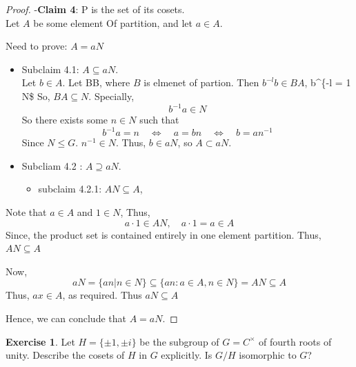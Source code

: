 \documentclass[
]{book}
\providecommand{\tightlist}{%
  \setlength{\itemsep}{0pt}\setlength{\parskip}{0pt}}
\theoremstyle{definition}
\theoremstyle{definition}
\theoremstyle{definition}
\newtheorem{exercise}{Exercise}[chapter]
\theoremstyle{definition}
\theoremstyle{remark}
\begin{document}
\begin{proof}
-\textbf{Claim 4}: P is the set of its cosets.\\
Let \(A\) be some element Of partition, and let \(a \in A\).

Need to prove: \(A=aN\)

\begin{itemize}
\item
  Subclaim 4.1: \(A\subseteq aN\).\\
  Let \(b\in A\). Let B\in B, where \(B\) is elmenet of partion.
  Then \(b^{-l}b\in BA\), \quad b\^{}\{-l = 1 \in N\$
  So, \(BA \subseteq N\). Specially,
  \[b^{-1}a \in N\]
  So there exists some \(n \in N\) such that
  \[b^{-1}a = n \quad \iff \quad a =bn \quad \iff \quad b=an^{-1}\]
  Since \(N\leq G\). \(n^{-1}\in N\). Thus, \(b \in aN\), so \(A \subset aN\).
\item
  Subcliam 4.2 : \(A\supseteq aN\).\\

  \begin{itemize}
  \tightlist
  \item
    subclaim 4.2.1: \(AN \subseteq A\),
  \end{itemize}
\end{itemize}

Note that \(a \in A\) and \(1 \in N\), Thus,
\[a\cdot 1\in AN, \quad a\cdot 1=a\in A\]
Since, the product set is contained entirely in one element
partition. Thus, \(AN\subseteq A\)

Now,
\[aN=\{an | n \in N\} \subseteq \{an : a\in A, n\in N\} = AN \subseteq  A \]
Thus, \(ax \in A\), as required. Thus \(aN\subseteq A\)

Hence, we can conclude that \(A =aN\).

\end{proof}

\begin{exercise}
\protect\hypertarget{exr:unnamed-chunk-99}{}\label{exr:unnamed-chunk-99}Let \(H = \{\pm1, \pm i\}\) be the subgroup of \(G = C^{\times}\) of fourth roots of unity. Describe the cosets of \(H\) in \(G\) explicitly. Is \(G / H\) isomorphic to \(G\)?
\end{exercise}
\end{document}
